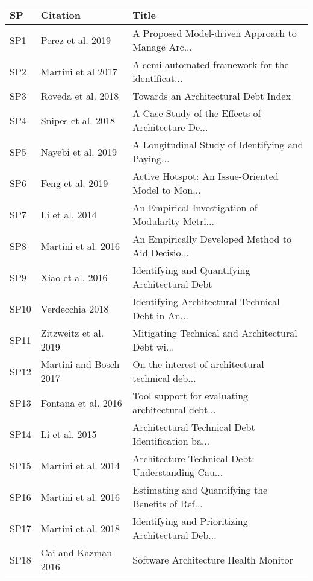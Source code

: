 \begin{tabular}{lll}
\toprule
   SP &                        Citation &                                              Title \\
\midrule
  SP1 &               Perez et al. 2019 &  A Proposed Model-driven Approach to Manage Arc... \\
  SP2 &              Martini et al 2017 &  A semi-automated framework for the identificat... \\
  SP3 &              Roveda et al. 2018 &                Towards an Architectural Debt Index \\
  SP4 &              Snipes et al. 2018 &  A Case Study of the Effects of Architecture De... \\
  SP5 &              Nayebi et al. 2019 &  A Longitudinal Study of Identifying and Paying... \\
  SP6 &                Feng et al. 2019 &  Active Hotspot: An Issue-Oriented Model to Mon... \\
  SP7 &                  Li et al. 2014 &  An Empirical Investigation of Modularity Metri... \\
  SP8 &             Martini et al. 2016 &  An Empirically Developed Method to Aid Decisio... \\
  SP9 &                Xiao et al. 2016 &     Identifying and Quantifying Architectural Debt \\
 SP10 &                 Verdecchia 2018 &  Identifying Architectural Technical Debt in An... \\
 SP11 &           Zitzweitz et al. 2019 &  Mitigating Technical and Architectural Debt wi... \\
 SP12 &          Martini and Bosch 2017 &  On the interest of architectural technical deb... \\
 SP13 &             Fontana et al. 2016 &  Tool support for evaluating architectural debt... \\
 SP14 &                  Li et al. 2015 &  Architectural Technical Debt Identification ba... \\
 SP15 &             Martini et al. 2014 &  Architecture Technical Debt: Understanding Cau... \\
 SP16 &             Martini et al. 2016 &  Estimating and Quantifying the Benefits of Ref... \\
 SP17 &             Martini et al. 2018 &  Identifying and Prioritizing Architectural Deb... \\
 SP18 &             Cai and Kazman 2016 &               Software Architecture Health Monitor \\

\end{tabular}

